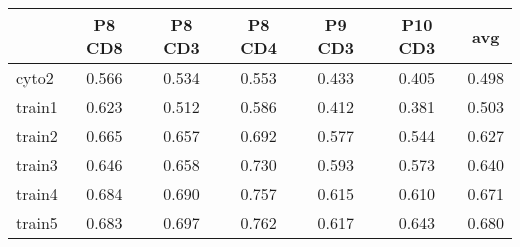 \documentclass{article}
\begin{document}
\begin{tabular}{lcccccc}
   \hline  &P8 CD8& P8 CD3& P8 CD4& P9 CD3& P10 CD3& avg\\ 
\hline
cyto2 & 0.566 & 0.534 & 0.553 & 0.433 & 0.405 & 0.498 \\ 
  train1 & 0.623 & 0.512 & 0.586 & 0.412 & 0.381 & 0.503 \\ 
  train2 & 0.665 & 0.657 & 0.692 & 0.577 & 0.544 & 0.627 \\ 
  train3 & 0.646 & 0.658 & 0.730 & 0.593 & 0.573 & 0.640 \\ 
  train4 & 0.684 & 0.690 & 0.757 & 0.615 & 0.610 & 0.671 \\ 
  train5 & 0.683 & 0.697 & 0.762 & 0.617 & 0.643 & 0.680 \\ 
   \hline
\end{tabular}
\end{document}
